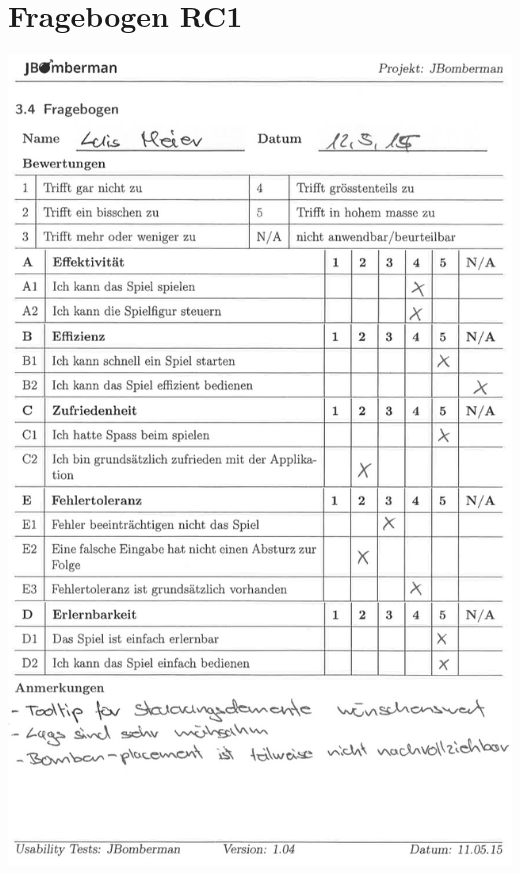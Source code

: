 \documentclass[11pt]{scrartcl}
\begin{document}
\section{Fragebogen RC1}
\includegraphics[scale=0.85]{Luis_RC1}
\end{document}
